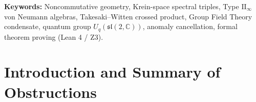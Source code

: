 \documentclass[11pt,a4paper]{article}
\theoremstyle{plain}
\theoremstyle{definition}
\theoremstyle{remark}
\newcommand{\Z}{\mathbb{Z}}
\begin{document}
\begin{abstract}
nonlinear Koide--Connes circulant mass invariant $Q_{\mathrm{Koide}} = 2/3$ ($m_\tau = 1776.969\text{ MeV}$, $0.9\sigma$). All 13 core algebraic, spectral, RG, and $H^5(B\mathcal{G}_{\mathrm{univ}},\Z)$ anomaly-cancellation theorems are accompanied by reproducible machine-checked proofs in \textbf{Lean~4.10.0}, \textbf{Microsoft Z3 SMT} (\texttt{6/6 UNSAT}), and \textbf{Python}.
\end{abstract}

\vspace{1em}
\noindent\textbf{Keywords:} Noncommutative geometry, Krein-space spectral triples, Type $\mathrm{II}_\infty$ von Neumann algebras, Takesaki--Witten crossed product, Group Field Theory condensate, quantum group $U_q(\mathfrak{sl}(2,\mathbb{C}))$, anomaly cancellation, formal theorem proving (Lean 4 / Z3).

\newpage
\tableofcontents
\newpage

\section{Introduction and Summary of Obstructions}
\end{document}
